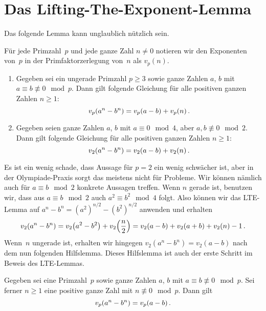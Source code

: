 \section{Das Lifting-The-Exponent-Lemma}\label{kapitel:LTE}
Das folgende Lemma kann unglaublich nützlich sein.
\begin{satzmitnamen}
	Für jede Primzahl~$p$ und jede ganze Zahl $n\neq 0$ notieren wir den Exponenten von~$p$ in der Primfaktorzerlegung von~$n$ als $v_p(n)$.
	\begin{enumerate}
		\item Gegeben sei ein ungerade Primzahl $p\geqslant 3$ sowie ganze Zahlen $a$, $b$ mit $a\equiv b\not\equiv 0\mod p$. Dann gilt folgende Gleichung für alle positiven ganzen Zahlen $n\geqslant 1$:\label{behauptung:LTEpUngerade}
		\begin{equation*}
			v_p\parens*{a^n-b^n}=v_p(a-b)+v_p(n)\,.
		\end{equation*}
		\item Gegeben seien ganze Zahlen $a$, $b$ mit $a\equiv 0\mod 4$, aber $a,b\not\equiv 0\mod 2$. Dann gilt folgende Gleichung für alle positiven ganzen Zahlen $n\geqslant 1$:\label{behauptung:LTEp=2}
		\begin{equation*}
			v_2\parens*{a^n-b^n}=v_2(a-b)+v_2(n)\,.
		\end{equation*}
	\end{enumerate}
\end{satzmitnamen}
Es ist ein wenig schade, dass Aussage für $p=2$ ein wenig schwächer ist, aber in der Olympiade-Praxis sorgt das meistens nicht für Probleme. Wir können nämlich auch für $a\equiv b\mod 2$ konkrete Aussagen treffen. Wenn $n$ gerade ist, benutzen wir, dass aus $a\equiv b\mod 2$ auch $a^2\equiv b^2\mod 4$ folgt. Also können wir das LTE-Lemma auf $a^n-b^n=(a^2)^{n/2}-(b^2)^{n/2}$ anwenden und erhalten
\begin{equation*}
	v_2\parens*{a^n-b^n}=v_2\parens*{a^2-b^2}+v_2\parens*{\frac n2}=v_2(a-b)+v_2(a+b)+v_2(n)-1\,.
\end{equation*}
Wenn~$n$ ungerade ist, erhalten wir hingegen $v_2(a^n-b^n)=v_2(a-b)$ nach dem nun folgenden Hilfslemma. Dieses Hilfslemma ist auch der erste Schritt im Beweis des LTE-Lemmas.
\begin{satzmitnamen}[Lemma]
	Gegeben sei eine Primzahl~$p$  sowie ganze Zahlen $a$, $b$ mit $a\equiv b\not\equiv 0\mod p$. Sei ferner $n\geqslant 1$ eine positive ganze Zahl mit $n\not\equiv 0\mod p$. Dann gilt
	\begin{equation*}
		v_p\parens*{a^n-b^n}=v_p(a-b)\,.
	\end{equation*}
\end{satzmitnamen}
